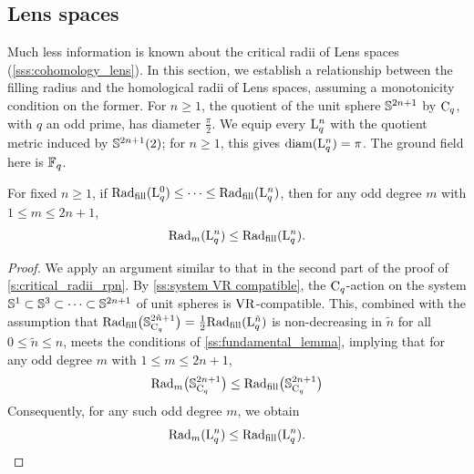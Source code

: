\subsection{Lens spaces}\label{s:critical_radii_lens}

Much less information is known about the critical radii of Lens spaces (\cref{sss:cohomology_lens}).
In this section, we establish a relationship between the filling radius and the homological radii of Lens spaces, assuming a monotonicity condition on the former.
For $n \geq 1$, the quotient of the unit sphere \(\mathbb{S}^{2n+1}\) by \(\mathrm{C}_q\), with $q$ an odd prime, has diameter \(\frac{\pi}{2}\).
We equip every \(\mathrm{L}_q^n\) with the quotient metric induced by \(\mathbb{S}^{2n+1}(2)\); for $n \geq 1$, this gives \(\operatorname{diam}(\mathrm{L}_q^n) = \pi\).
The ground field here is $\mathbb{F}_q$.

\lemma
For fixed $n \geq 1$, if $\mathrm{Rad}_{\mathrm{fill}}(\mathrm{L}^0_q) \leq \dotsb \leq \mathrm{Rad}_{\mathrm{fill}}(\mathrm{L}^n_q)$, then for any odd degree $m$ with $1 \leq m \leq 2n+1$,
\[
\mathrm{Rad}_{m}(\mathrm{L}^n_q) \leq \mathrm{Rad}_{\mathrm{fill}}(\mathrm{L}^n_q).
\]

\begin{proof}
	We apply an argument similar to that in the second part of the proof of \cref{s:critical_radii_rpn}.
	By \cref{ss:system VR compatible}, the $\mathrm{C}_q$-action on the system $\mathbb{S}^1 \subset \mathbb{S}^3 \subset \dotsb \subset \mathbb{S}^{2n+1}$ of unit spheres is \(\mathrm{VR}\)-compatible.
	This, combined with the assumption that $\mathrm{Rad}_{\mathrm{fill}}\big(\mathbb{S}^{2\tilde{n}+1}_{\mathrm{C}_q}\big) = \tfrac{1}{2} \mathrm{Rad}_{\mathrm{fill}}(\mathrm{L}^{\tilde{n}}_q)$ is non-decreasing in $\tilde{n}$ for all $0\leq \tilde{n} \leq n$, meets the conditions of \cref{ss:fundamental_lemma}, implying that for any odd degree $m$ with $1 \leq m \leq 2n+1$,
	\[
	\mathrm{Rad}_m\big(\mathbb{S}^{2n+1}_{\mathrm{C}_q}\big) \leq \mathrm{Rad}_{\mathrm{fill}}\big(\mathbb{S}^{2n+1}_{\mathrm{C}_q}\big)
	\]
	Consequently, for any such odd degree $m$, we obtain
	\[
	\mathrm{Rad}_{m}(\mathrm{L}^n_q) \leq \mathrm{Rad}_{\mathrm{fill}}(\mathrm{L}^n_q). \qedhere
	\]
\end{proof}

